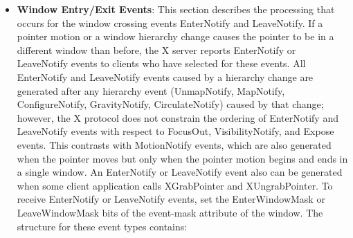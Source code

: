 \documentclass{report}
\begin{document}
\begin{itemize}
\begin{itemize}
                \item source window = where the event logically originated
                \item event window  = the window to which this particular event was delivered
            \end{itemize}
            \textbf{Reminder}: The do-not-propagate mask is a per-window attribute that says: “If this kind of input event starts here, and nobody selected it here, do not let it bubble upward to ancestor windows.”
        \item \textbf{Window Entry/Exit Events}: This section describes the processing that occurs for the window crossing events EnterNotify and LeaveNotify. If a pointer motion or a window hierarchy change causes the pointer to be in a different window than before, the X server reports EnterNotify or LeaveNotify events to clients who have selected for these events. All EnterNotify and LeaveNotify events caused by a hierarchy change are generated after any hierarchy event (UnmapNotify, MapNotify, ConfigureNotify, GravityNotify, CirculateNotify) caused by that change; however, the X protocol does not constrain the ordering of EnterNotify and LeaveNotify events with respect to FocusOut, VisibilityNotify, and Expose events.
            \bigbreak \noindent 
            This contrasts with MotionNotify events, which are also generated when the pointer moves but only when the pointer motion begins and ends in a single window. An EnterNotify or LeaveNotify event also can be generated when some client application calls XGrabPointer and XUngrabPointer.
            \bigbreak \noindent 
            To receive EnterNotify or LeaveNotify events, set the EnterWindowMask or LeaveWindowMask bits of the event-mask attribute of the window.
            \bigbreak \noindent 
            The structure for these event types contains:


\end{itemize}
\end{document}
